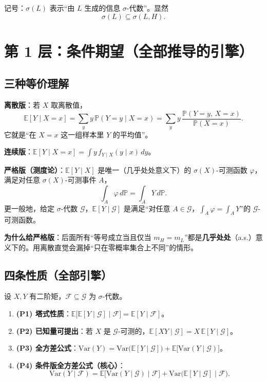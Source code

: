\documentclass[UTF8,11pt,a4paper]{ctexart}
\newcommand{\E}{\mathbb{E}}
\newcommand{\Var}{\mathrm{Var}}
\begin{document}
记号：$\sigma(L)$ 表示``由 $L$ 生成的信息 $\sigma$-代数''。显然
\[
\sigma(L)\subseteq\sigma(L,H).
\]

\section{第 1 层：条件期望（全部推导的引擎）}

\subsection{三种等价理解}

\textbf{离散版}：若 $X$ 取离散值，
\[
\E[Y\mid X=x]=\sum_y y\,\mathbb P(Y=y\mid X=x)=\sum_y y\,\frac{\mathbb P(Y=y,\,X=x)}{\mathbb P(X=x)} .
\]
它就是``在 $X=x$ 这一组样本里 $Y$ 的平均值''。

\textbf{连续版}：$\E[Y\mid X=x]=\int y\,f_{Y\mid X}(y\mid x)\,dy$。

\textbf{严格版（测度论）}：$\E[Y\mid X]$ 是唯一（几乎处处意义下）的 $\sigma(X)$-可测函数 $\varphi$，满足对任意 $\sigma(X)$-可测事件 $A$，
\[
\int_A\varphi\,d\mathbb P=\int_A Y\,d\mathbb P .
\]
更一般地，给定 $\sigma$-代数 $\mathcal G$，$\E[Y\mid\mathcal G]$ 是满足``对任意 $A\in\mathcal G$，$\int_A\varphi=\int_A Y$''的 $\mathcal G$-可测函数。

\textbf{为什么给严格版}：后面所有``等号成立当且仅当 $m_H=m_L$''都是\textbf{几乎处处}（a.s.）意义下的。用离散直觉会漏掉``只在零概率集合上不同''的情形。

\subsection{四条性质（全部引擎）}
设 $X,Y$ 有二阶矩，$\mathcal F\subseteq\mathcal G$ 为 $\sigma$-代数。

\begin{enumerate}
  \item \textbf{(P1) 塔式性质}：$\E\big[\E[Y\mid\mathcal G]\mid\mathcal F\big]=\E[Y\mid\mathcal F]$。
  \item \textbf{(P2) 已知量可提出}：若 $X$ 是 $\mathcal G$-可测的，$\E[XY\mid\mathcal G]=X\,\E[Y\mid\mathcal G]$。
  \item \textbf{(P3) 全方差公式}：$\Var(Y)=\Var\big(\E[Y\mid\mathcal G]\big)+\E\big[\Var(Y\mid\mathcal G)\big]$。
  \item \textbf{(P4) 条件版全方差公式（核心）}：
  \[
  \Var(Y\mid\mathcal F)=\E\big[\Var(Y\mid\mathcal G)\mid\mathcal F\big]+\Var\big(\E[Y\mid\mathcal G]\mid\mathcal F\big).
  \]
\end{enumerate}
\end{document}
